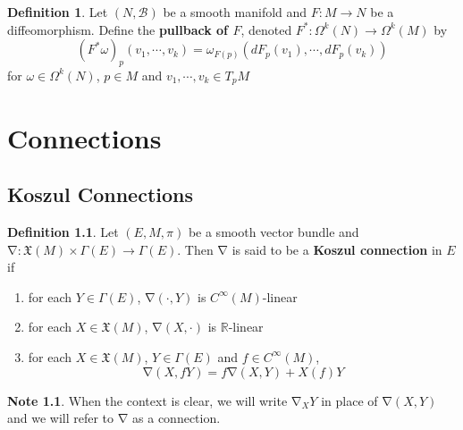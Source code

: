 \documentclass{book}
\theoremstyle{definition}
\newtheorem{defn}[definition]{Definition}
\newtheorem{note}[definition]{Note}
\newcommand{\om}{\omega}
\newcommand{\Gam}{\Gamma}
\newcommand{\Om}{\Omega}
\newcommand{\R}{\mathbb{R}}
\newcommand{\MB}{\mathcal{B}}
\newcommand{\MFX}{\mathfrak{X}}
\DeclareMathOperator{\nab}{\nabla}
\DeclareMathOperator*{\0}{\mbf{0}}
\DeclareMathOperator*{\1}{\mbf{1}}
\newcommand{\tbf}[1]{\textbf{#1}}
\begin{document}
	
	\begin{defn}
		Let $(N, \MB)$ be a smooth manifold and $F: M \rightarrow N$ be a diffeomorphism. Define the \tbf{pullback of $F$}, denoted $F^*: \Om^k(N) \rightarrow \Om^k(M)$ by  $$(F^* \om)_p (v_1, \cdots, v_k) = \om_{F(p)} (dF_p(v_1), \cdots, dF_p(v_k))$$ for $\om \in \Om^k(N)$, $p \in M$ and $v_1, \cdots, v_k \in T_{p}M$
	\end{defn}





	


























	
	\newpage
	\chapter{Connections}
	
	\section{Koszul Connections}
	
	\begin{defn}
		Let $(E, M, \pi)$ be a smooth vector bundle and $\nab : \MFX(M) \times \Gam(E) \rightarrow \Gam(E)$. Then $\nab$ is said to be a \tbf{Koszul connection} in $E$ if 
		\begin{enumerate}
			\item for each $Y \in \Gam(E)$, $\nab(\cdot, Y)$ is $C^{\infty}(M)$-linear
			\item for each $X \in \MFX(M)$, $\nab(X, \cdot)$ is $\R$-linear
			\item for each $X \in \MFX(M)$, $Y \in \Gam(E)$ and $f \in C^{\infty}(M)$, 
			$$\nab(X, fY) = f \nab(X, Y) + X(f)Y$$ 
		\end{enumerate}
	\end{defn}

	\begin{note}
		When the context is clear, we will write $\nab_X Y$ in place of $\nab(X,Y)$ and we will refer to $\nab$ as a connection.
	\end{note}
\end{document}
